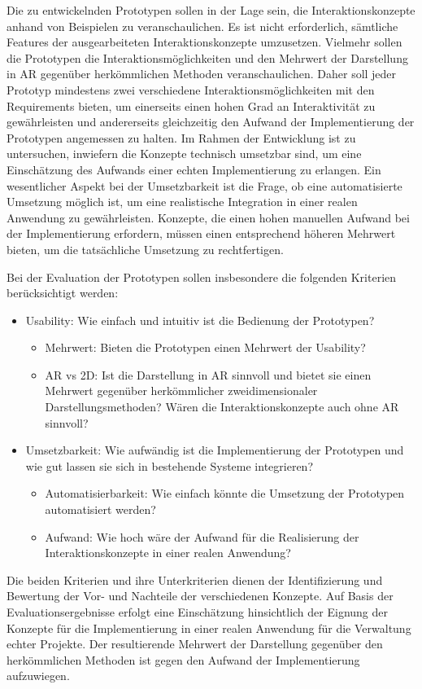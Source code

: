 Die zu entwickelnden Prototypen sollen in der Lage sein, die Interaktionskonzepte anhand von Beispielen zu veranschaulichen.
Es ist nicht erforderlich, sämtliche Features der ausgearbeiteten Interaktionskonzepte umzusetzen.
Vielmehr sollen die Prototypen die Interaktionsmöglichkeiten und den Mehrwert der Darstellung in AR gegenüber herkömmlichen Methoden veranschaulichen.
Daher soll jeder Prototyp mindestens zwei verschiedene Interaktionsmöglichkeiten mit den Requirements bieten, um einerseits einen hohen Grad an Interaktivität zu gewährleisten und andererseits gleichzeitig den Aufwand der Implementierung der Prototypen angemessen zu halten.
Im Rahmen der Entwicklung ist zu untersuchen, inwiefern die Konzepte technisch umsetzbar sind, um eine Einschätzung des Aufwands einer echten Implementierung zu erlangen.
Ein wesentlicher Aspekt bei der Umsetzbarkeit ist die Frage, ob eine automatisierte Umsetzung möglich ist, um eine realistische Integration in einer realen Anwendung zu gewährleisten.
Konzepte, die einen hohen manuellen Aufwand bei der Implementierung erfordern, müssen einen entsprechend höheren Mehrwert bieten, um die tatsächliche Umsetzung zu rechtfertigen. 

\newpage

Bei der Evaluation der Prototypen sollen insbesondere die folgenden Kriterien berücksichtigt werden:

\begin{itemize}
    \item Usability: Wie einfach und intuitiv ist die Bedienung der Prototypen?
    \begin{itemize}
        \item Mehrwert: Bieten die Prototypen einen Mehrwert der Usability?
        \item AR vs 2D: Ist die Darstellung in AR sinnvoll und bietet sie einen Mehrwert gegenüber herkömmlicher zweidimensionaler Darstellungsmethoden? Wären die Interaktionskonzepte auch ohne AR sinnvoll?
    \end{itemize}
    \item Umsetzbarkeit: Wie aufwändig ist die Implementierung der Prototypen und wie gut lassen sie sich in bestehende Systeme integrieren?
    \begin{itemize}
        \item Automatisierbarkeit: Wie einfach könnte die Umsetzung der Prototypen automatisiert werden?
        \item Aufwand: Wie hoch wäre der Aufwand für die Realisierung der Interaktionskonzepte in einer realen Anwendung?
    \end{itemize}
\end{itemize}

Die beiden Kriterien und ihre Unterkriterien dienen der Identifizierung und Bewertung der Vor- und Nachteile der verschiedenen Konzepte.
Auf Basis der Evaluationsergebnisse erfolgt eine Einschätzung hinsichtlich der Eignung der Konzepte für die Implementierung in einer realen Anwendung für die Verwaltung echter Projekte.
Der resultierende Mehrwert der Darstellung gegenüber den herkömmlichen Methoden ist gegen den Aufwand der Implementierung aufzuwiegen.

